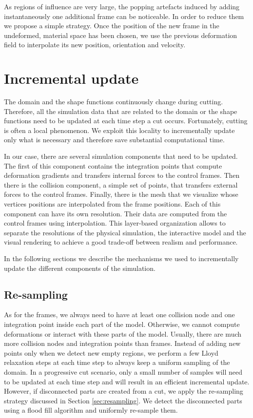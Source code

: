 As regions of influence are very large, the popping artefacts induced by adding instantaneously one additional frame can be noticeable. In order to reduce them we propose a simple strategy. Once the position of the new frame in the undeformed, material space has been chosen, we use the previous deformation field to interpolate its new position, orientation and velocity.

\section{Incremental update} \label{sec:incremental}

The domain and the shape functions continuously change during cutting. Therefore, all the simulation data that are related to the domain or the shape functions need to be updated at each time step a cut occurs. Fortunately, cutting is often a local phenomenon. We exploit this locality to incrementally update only what is necessary and therefore save substantial computational time.

In our case, there are several simulation components that need to be updated. The first of this component contains the integration points that compute deformation gradients and transfers internal forces to the control frames. Then there is the collision component, a simple set of points, that transfers external forces to the control frames. Finally, there is the mesh that we visualize whose vertices positions are interpolated from the frame positions. Each of this component can have its own resolution. Their data are computed from the control frames using interpolation. This layer-based organization allows to separate the resolutions of the physical simulation, the interactive model and the visual rendering to achieve a good trade-off between realism and performance.

In the following sections we describe the mechanisms we used to incrementally update the different components of the simulation.

\subsection{Re-sampling}
\label{sec:all_resampling}
As for the frames, we always need to have at least one collision node and one integration point inside each part of the model. Otherwise, we cannot compute deformations or interact with these parts of the model. Usually, there are much more collision nodes and integration points than frames. Instead of adding new points only when we detect new empty regions, we perform a few Lloyd relaxation steps at each time step to always keep a uniform sampling of the domain. In a progressive cut scenario, only a small number of samples will need to be updated at each time step and will result in an efficient incremental update. However, if disconnected parts are created from a cut, we apply the re-sampling strategy discussed in Section \ref{sec:resampling}. We detect the disconnected parts using a flood fill algorithm and uniformly re-sample them.

